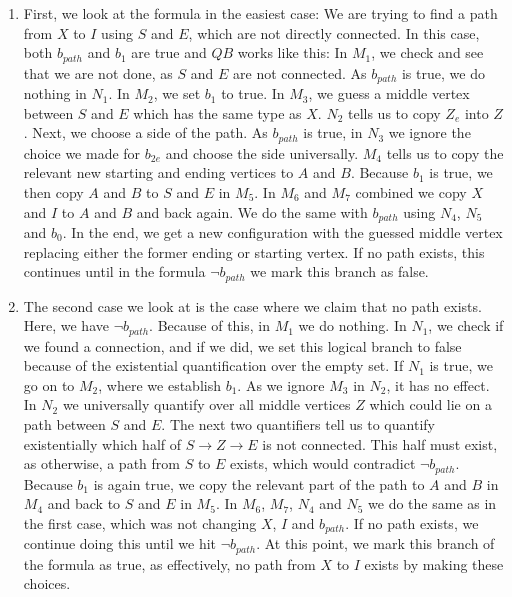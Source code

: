 \begin{enumerate}
    \item First, we look at the formula in the easiest case: We are trying to find a path from $X$ to $I$ using $S$ and $E$, which are not directly connected.
    In this case, both $b_{path}$ and $b_1$ are true and $QB$ works like this:
    In $M_1$, we check and see that we are not done, as $S$ and $E$ are not connected.
    As $b_{path}$ is true, we do nothing in $N_1$.
    In $M_2$, we set $b_1$ to true.
    In $M_3$, we guess a middle vertex between $S$ and $E$ which has the same type as $X$. %
    $N_2$ tells us to copy $Z_e$ into $Z$.
    Next, we choose a side of the path.
    As $b_{path}$ is true, in $N_3$ we ignore the choice we made for $b_{2e}$ and choose the side universally.
    $M_4$ tells us to copy the relevant new starting and ending vertices to $A$ and $B$.
    Because $b_1$ is true, we then copy $A$ and $B$ to $S$ and $E$ in $M_5$.
    In $M_6$ and $M_7$ combined we copy $X$ and $I$ to $A$ and $B$ and back again.
    We do the same with $b_{path}$ using $N_4$, $N_5$ and $b_0$.
    In the end, we get a new configuration with the guessed middle vertex replacing either the former ending or starting vertex.
    If no path exists, this continues until in the formula $\neg b_{path}$ we mark this branch as false.

    \item The second case we look at is the case where we claim that no path exists.
    Here, we have $\neg b_{path}$.
    Because of this, in $M_1$ we do nothing.
    In $N_1$, we check if we found a connection, and if we did, we set this logical branch to false because of the existential quantification over the empty set. %
    If $N_1$ is true, we go on to $M_2$, where we establish $b_1$.
    As we ignore $M_3$ in $N_2$, it has no effect.
    In $N_2$ we universally quantify over all middle vertices $Z$ which could lie on a path between $S$ and $E$.
    The next two quantifiers tell us to quantify existentially which half of $S \to Z \to E$ is not connected.
    This half must exist, as otherwise, a path from $S$ to $E$ exists, which would contradict $\neg b_{path}$.
    Because $b_1$ is again true, we copy the relevant part of the path to $A$ and $B$ in $M_4$ and back to $S$ and $E$ in $M_5$.
    In $M_6$, $M_7$, $N_4$ and $N_5$ we do the same as in the first case, which was not changing $X$, $I$ and $b_{path}$.
    If no path exists, we continue doing this until we hit $\neg b_{path}$.
    At this point, we mark this branch of the formula as true, as effectively, no path from $X$ to $I$ exists by making these choices.


\end{enumerate}
